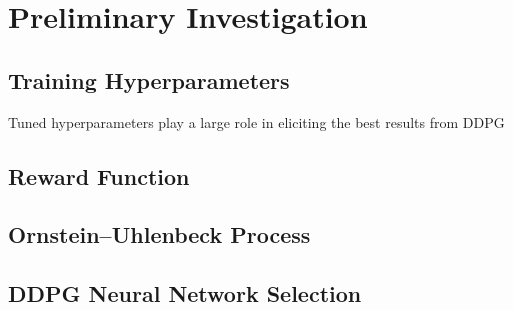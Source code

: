 \section{Preliminary Investigation}


\subsection{Training Hyperparameters}
Tuned hyperparameters play a large role in eliciting the best results from DDPG


\subsection{Reward Function}


\subsection{Ornstein–Uhlenbeck Process}


\subsection{DDPG Neural Network Selection}